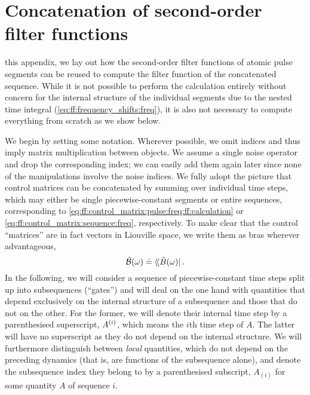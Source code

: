 \chapter{Concatenation of second-order filter functions}\label{ch:app:ff:concatenation}
 this appendix, we lay out how the second-order filter functions of atomic pulse segments can be reused to compute the filter function of the concatenated sequence.
While it is not possible to perform the calculation entirely without concern for the internal structure of the individual segments due to the nested time integral (\cf \cref{eq:ff:frequency_shifts:freq}), it is also not necessary to compute everything from scratch as we show below.

We begin by setting some notation.
Wherever possible, we omit indices and thus imply matrix multiplication between objects.
We assume a single noise operator and drop the corresponding index; we can easily add them again later since none of the manipulations involve the noise indices.
We fully adopt the picture that control matrices can be concatenated by summing over individual time steps, which may either be single piecewise-constant segments or entire sequences, corresponding to \cref{eq:ff:control_matrix:pulse:freq:ff:calculation} or \cref{eq:ff:control_matrix:sequence:freq}, respectively.
To make clear that the control \enquote{matrices} are in fact vectors in Liouville space, we write them as bras wherever advantageous,
\begin{equation}
    \ctrlmat(\omega) \doteq \dbra*{\Bt(\omega)}.
\end{equation}
In the following, we will consider a sequence of piecewise-constant time steps split up into subsequences (\enquote{gates}) and will deal on the one hand with quantities that depend exclusively on the internal structure of a subsequence and those that do not on the other.
For the former, we will denote their internal time step by a parenthesised superscript, \eg $A^{(i)}$, which means the $i$th time step of $A$.
The latter will have no superscript as they do not depend on the internal structure.
We will furthermore distinguish between \emph{local} quantities, which do not depend on the preceding dynamics (that is, are functions of the subsequence alone), and denote the subsequence index they belong to by a parenthesised subscript, \eg $A_{(i)}$ for some quantity $A$ of sequence $i$.
